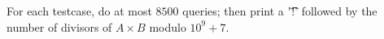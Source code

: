 For each testcase, do at most $8500$ queries; then print a \t{'!'} followed by the number of divisors of $A \times B$ modulo $10^9 + 7$.